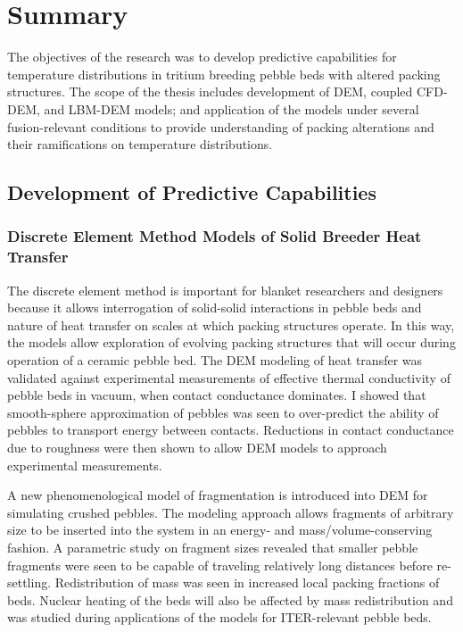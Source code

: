 \chapter{Summary}\label{sec:summary}
The objectives of the research was to develop predictive capabilities for temperature distributions in tritium breeding pebble beds with altered packing structures. The scope of the thesis includes development of DEM, coupled CFD-DEM, and LBM-DEM models; and application of the models under several fusion-relevant conditions to provide understanding of packing alterations and their ramifications on temperature distributions.

\section{Development of Predictive Capabilities}
\subsection{Discrete Element Method Models of Solid Breeder Heat Transfer}
The discrete element method is important for blanket researchers and designers because it allows interrogation of solid-solid interactions in pebble beds and nature of heat transfer on scales at which packing structures operate. In this way, the models allow exploration of evolving packing structures that will occur during operation of a ceramic pebble bed. The DEM modeling of heat transfer was validated against experimental measurements of effective thermal conductivity of pebble beds in vacuum, when contact conductance dominates. I showed that smooth-sphere approximation of pebbles was seen to over-predict the ability of pebbles to transport energy between contacts. Reductions in contact conductance due to roughness were then shown to allow DEM models to approach experimental measurements.

A new phenomenological model of fragmentation is introduced into DEM for simulating crushed pebbles. The modeling approach allows fragments of arbitrary size to be inserted into the system in an energy- and mass/volume-conserving fashion. A parametric study on fragment sizes revealed that smaller pebble fragments were seen to be capable of traveling relatively long distances before re-settling. Redistribution of mass was seen in increased local packing fractions of beds. Nuclear heating of the beds will also be affected by mass redistribution and was studied during applications of the models for ITER-relevant pebble beds.

